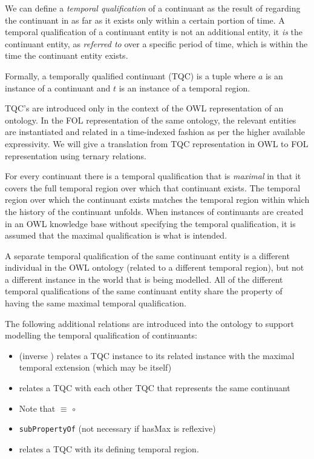
We can define a \emph{temporal qualification} of a
continuant as the result of regarding the continuant in as far as it exists only
within a certain portion of time. A temporal qualification of a continuant entity is
not an additional entity, it \emph{is} the continuant entity, as \emph{referred to}
over a specific period of time, which is within the time the continuant entity
exists.

Formally, a temporally qualified continuant (TQC) is a tuple 
where $a$ is an instance
of a continuant and $t$ is an instance of a temporal region.

TQC's are introduced only in the context of the OWL representation of
an ontology. In the FOL representation of the same ontology, the relevant
entities are instantiated and related in a time-indexed fashion
as per the higher available expressivity.
We will give a translation from TQC representation in OWL to
FOL representation using ternary relations.

For every continuant there is a temporal qualification that is \textit{maximal} in that it covers the full temporal region over which that continuant exists. The temporal region over which the continuant exists matches the temporal region within which the history of the continuant unfolds. When instances of continuants are created in an OWL knowledge base without specifying the temporal qualification, it is assumed that the maximal qualification is what is intended.

A separate temporal qualification of the same continuant entity is a different individual in the OWL ontology (related to a different temporal region), but not a different instance in the world that is being modelled. All of the different temporal qualifications of the same continuant entity share the property of having the same maximal temporal qualification.

The following additional relations are introduced into the ontology to support modelling the temporal qualification of continuants:
\begin{itemize}
    \item {} (inverse ) relates a TQC instance to its related instance with the maximal temporal extension (which may be itself)
    \item {} relates a TQC with each other TQC that represents the same continuant
    \item Note that  $\equiv$  $\circ$ 
    \item {} \texttt{subPropertyOf}  (not necessary if hasMax is reflexive)
    \item {} relates a TQC with its defining temporal region.
\end{itemize}

